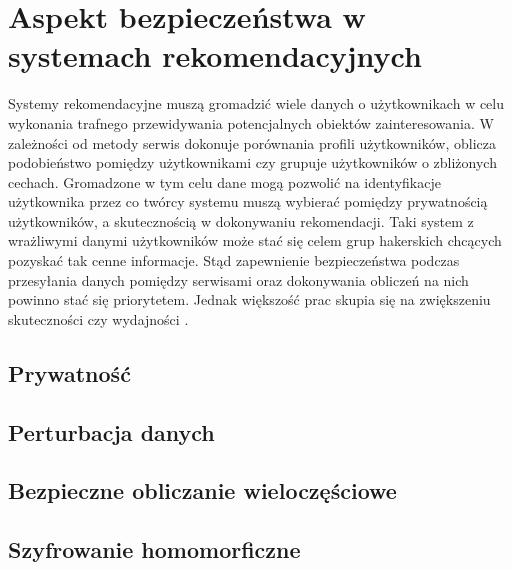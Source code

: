 
\chapter{Aspekt bezpieczeństwa w systemach rekomendacyjnych}
Systemy rekomendacyjne muszą gromadzić wiele danych o użytkownikach w celu wykonania trafnego przewidywania potencjalnych obiektów zainteresowania. W zależności od metody serwis dokonuje porównania  profili użytkowników, oblicza podobieństwo pomiędzy użytkownikami czy grupuje użytkowników o zbliżonych cechach. Gromadzone w tym celu dane mogą pozwolić na identyfikacje użytkownika przez co twórcy systemu muszą wybierać pomiędzy prywatnością użytkowników, a skutecznością w dokonywaniu rekomendacji. Taki system z wrażliwymi danymi użytkowników może stać się celem grup hakerskich chcących pozyskać tak cenne informacje. Stąd zapewnienie bezpieczeństwa podczas przesyłania danych pomiędzy serwisami oraz dokonywania obliczeń na nich powinno stać się priorytetem. Jednak większość prac skupia się na zwiększeniu skuteczności czy wydajności \cite{recent_developments}.

\section{Prywatność}

\section{Perturbacja danych}

\section{Bezpieczne obliczanie wieloczęściowe}

\section{Szyfrowanie homomorficzne}
